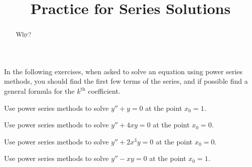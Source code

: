\documentclass{ximera}
\title{Practice for Series Solutions}
\begin{document}
\begin{abstract}
Why?
\end{abstract}
\maketitle



In the following exercises, when asked to solve an equation using power series methods, you should find the first few terms of the series, and if possible find a general formula for the $k^{\text{th}}$ coefficient.

\begin{exercise}
    Use power series methods to solve $y''+y = 0$ at the point $x_0 = 1$.
\end{exercise}

\begin{exercise}
    Use power series methods to solve $y''+4xy = 0$ at the point $x_0 = 0$.
\end{exercise}

\begin{exercise}%
    Use power series methods to solve $y'' + 2 x^3 y = 0$ at the point $x_0 = 0$.
\end{exercise}


\begin{exercise}
    Use power series methods to solve $y''-xy = 0$ at the point $x_0 = 1$.
\end{exercise}
\end{document}
